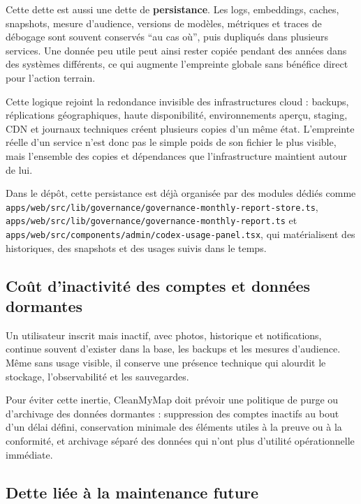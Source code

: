 \documentclass[
  10pt,
  a4paper,
  DIV=11,
  numbers=noendperiod,
  oneside]{scrreprt}
\let\oldtextbf\textbf
\renewcommand{\textbf}[1]{\oldtextbf{\textcolor{cmmnavy}{#1}}}
\begin{document}
Cette dette est aussi une dette de \textbf{persistance}. Les logs,
embeddings, caches, snapshots, mesure d'audience, versions de modèles,
métriques et traces de débogage sont souvent conservés ``au cas où'',
puis dupliqués dans plusieurs services. Une donnée peu utile peut ainsi
rester copiée pendant des années dans des systèmes différents, ce qui
augmente l'empreinte globale sans bénéfice direct pour l'action terrain.

Cette logique rejoint la redondance invisible des infrastructures cloud
: backups, réplications géographiques, haute disponibilité,
environnements aperçu, staging, CDN et journaux techniques créent
plusieurs copies d'un même état. L'empreinte réelle d'un service n'est
donc pas le simple poids de son fichier le plus visible, mais l'ensemble
des copies et dépendances que l'infrastructure maintient autour de lui.

Dans le dépôt, cette persistance est déjà organisée par des modules
dédiés comme
\texttt{apps/web/src/lib/governance/governance-monthly-report-store.ts},
\texttt{apps/web/src/lib/governance/governance-monthly-report.ts} et
\texttt{apps/web/src/components/admin/codex-usage-panel.tsx}, qui
matérialisent des historiques, des snapshots et des usages suivis dans
le temps.

\subsection{Coût d'inactivité des comptes et données
dormantes}\label{couxfbt-dinactivituxe9-des-comptes-et-donnuxe9es-dormantes}

Un utilisateur inscrit mais inactif, avec photos, historique et
notifications, continue souvent d'exister dans la base, les backups et
les mesures d'audience. Même sans usage visible, il conserve une
présence technique qui alourdit le stockage, l'observabilité et les
sauvegardes.

Pour éviter cette inertie, CleanMyMap doit prévoir une politique de
purge ou d'archivage des données dormantes : suppression des comptes
inactifs au bout d'un délai défini, conservation minimale des éléments
utiles à la preuve ou à la conformité, et archivage séparé des données
qui n'ont plus d'utilité opérationnelle immédiate.

\subsection{Dette liée à la maintenance
future}\label{dette-liuxe9e-uxe0-la-maintenance-future}
\end{document}
